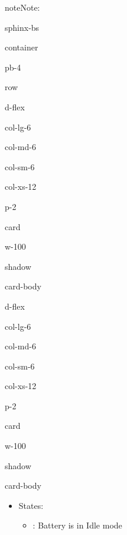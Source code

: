 \documentclass[letterpaper,10pt,english]{jupyterBook}
\begin{document}
\begin{sphinxadmonition}{note}{Note:}
\sphinxAtStartPar
{}

\begin{sphinxuseclass}{sphinx-bs}
\begin{sphinxuseclass}{container}
\begin{sphinxuseclass}{pb-4}
\begin{sphinxuseclass}{row}
\begin{sphinxuseclass}{d-flex}
\begin{sphinxuseclass}{col-lg-6}
\begin{sphinxuseclass}{col-md-6}
\begin{sphinxuseclass}{col-sm-6}
\begin{sphinxuseclass}{col-xs-12}
\begin{sphinxuseclass}{p-2}
\begin{sphinxuseclass}{card}
\begin{sphinxuseclass}{w-100}
\begin{sphinxuseclass}{shadow}
\begin{sphinxuseclass}{card-body}
\sphinxAtStartPar
{}

\end{sphinxuseclass}
\end{sphinxuseclass}
\end{sphinxuseclass}
\end{sphinxuseclass}
\end{sphinxuseclass}
\end{sphinxuseclass}
\end{sphinxuseclass}
\end{sphinxuseclass}
\end{sphinxuseclass}
\end{sphinxuseclass}
\begin{sphinxuseclass}{d-flex}
\begin{sphinxuseclass}{col-lg-6}
\begin{sphinxuseclass}{col-md-6}
\begin{sphinxuseclass}{col-sm-6}
\begin{sphinxuseclass}{col-xs-12}
\begin{sphinxuseclass}{p-2}
\begin{sphinxuseclass}{card}
\begin{sphinxuseclass}{w-100}
\begin{sphinxuseclass}{shadow}
\begin{sphinxuseclass}{card-body}\begin{itemize}
\item {} 
\sphinxAtStartPar
States:
\begin{itemize}
\item {} 
\sphinxAtStartPar
{}: Battery is in Idle mode


\end{itemize}
\end{itemize}
\end{sphinxuseclass}
\end{sphinxuseclass}
\end{sphinxuseclass}
\end{sphinxuseclass}
\end{sphinxuseclass}
\end{sphinxuseclass}
\end{sphinxuseclass}
\end{sphinxuseclass}
\end{sphinxuseclass}
\end{sphinxuseclass}
\end{sphinxuseclass}
\end{sphinxuseclass}
\end{sphinxuseclass}
\end{sphinxuseclass}
\end{sphinxadmonition}
\end{document}
